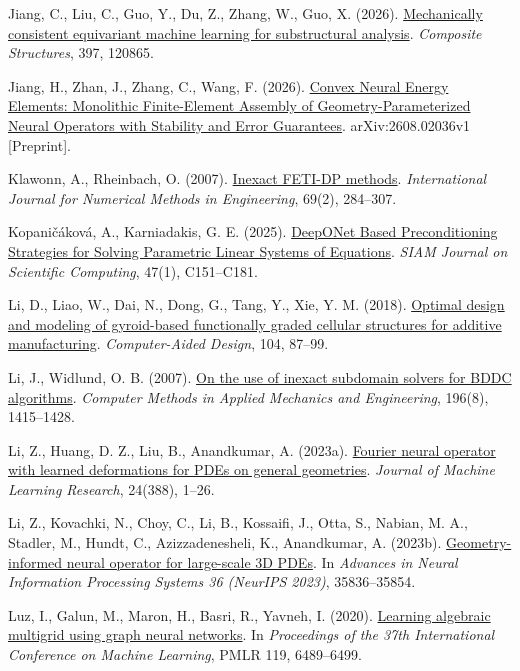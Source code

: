 \documentclass[preprint,12pt,authoryear]{elsarticle}
\begin{document}
Jiang, C., Liu, C., Guo, Y., Du, Z., Zhang, W., Guo, X. (2026). \href{https://doi.org/10.1016/j.compstruct.2026.120865}{Mechanically consistent equivariant machine learning for substructural analysis}. \emph{Composite Structures}, 397, 120865.

Jiang, H., Zhan, J., Zhang, C., Wang, F. (2026). \href{https://arxiv.org/abs/2608.02036v1}{Convex Neural Energy Elements: Monolithic Finite-Element Assembly of Geometry-Parameterized Neural Operators with Stability and Error Guarantees}. arXiv:2608.02036v1 {[}Preprint{]}.

Klawonn, A., Rheinbach, O. (2007). \href{https://doi.org/10.1002/nme.1758}{Inexact FETI-DP methods}. \emph{International Journal for Numerical Methods in Engineering}, 69(2), 284--307.

Kopaničáková, A., Karniadakis, G. E. (2025). \href{https://doi.org/10.1137/24m162861x}{DeepONet Based Preconditioning Strategies for Solving Parametric Linear Systems of Equations}. \emph{SIAM Journal on Scientific Computing}, 47(1), C151--C181.

Li, D., Liao, W., Dai, N., Dong, G., Tang, Y., Xie, Y. M. (2018). \href{https://doi.org/10.1016/j.cad.2018.06.003}{Optimal design and modeling of gyroid-based functionally graded cellular structures for additive manufacturing}. \emph{Computer-Aided Design}, 104, 87--99.

Li, J., Widlund, O. B. (2007). \href{https://doi.org/10.1016/j.cma.2006.03.011}{On the use of inexact subdomain solvers for BDDC algorithms}. \emph{Computer Methods in Applied Mechanics and Engineering}, 196(8), 1415--1428.

Li, Z., Huang, D. Z., Liu, B., Anandkumar, A. (2023a). \href{https://www.jmlr.org/papers/v24/23-0064.html}{Fourier neural operator with learned deformations for PDEs on general geometries}. \emph{Journal of Machine Learning Research}, 24(388), 1--26.

Li, Z., Kovachki, N., Choy, C., Li, B., Kossaifi, J., Otta, S., Nabian, M. A., Stadler, M., Hundt, C., Azizzadenesheli, K., Anandkumar, A. (2023b). \href{https://doi.org/10.52202/075280-1556}{Geometry-informed neural operator for large-scale 3D PDEs}. In \emph{Advances in Neural Information Processing Systems 36 (NeurIPS 2023)}, 35836--35854.

Luz, I., Galun, M., Maron, H., Basri, R., Yavneh, I. (2020). \href{https://proceedings.mlr.press/v119/luz20a.html}{Learning algebraic multigrid using graph neural networks}. In \emph{Proceedings of the 37th International Conference on Machine Learning}, PMLR 119, 6489--6499.
\end{document}
